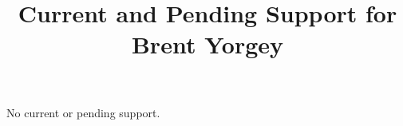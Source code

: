 \documentclass[11pt]{article}
\title{\vspace{-50px}Current and Pending Support for Brent Yorgey}
\author{}
\date{\vspace{-60px}}
\begin{document}
\maketitle  

No current or pending support.
\end{document}
